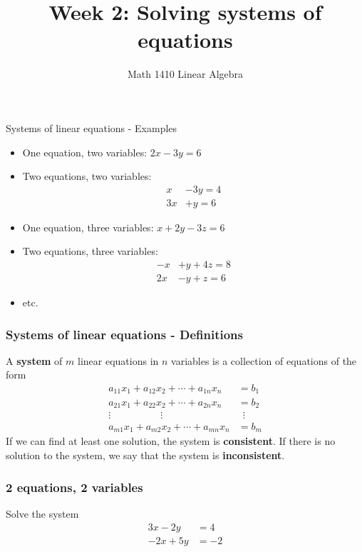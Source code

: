 \documentclass[12pt,t]{beamer}
\date{}
\author{Math 1410 Linear Algebra}
\title{Week 2: Solving systems of equations}
\begin{document}
\begin{frame}
\titlepage
\end{frame}


\begin{frame}{Systems of linear equations - Examples}
\begin{itemize}
 \item One equation, two variables: $2x-3y = 6$
 \item Two equations, two variables:
\begin{align*}
 x&-3y=4\\
3x&+y=6
\end{align*}
 \item One equation, three variables: $x+2y-3z=6$
 \item Two equations, three variables:
\begin{align*}
 -x&+y+4z=8\\
 2x&-y+z=6
\end{align*}
\item etc.
\end{itemize}
\end{frame}
\begin{frame}\frametitle{Systems of linear equations - Definitions}
 \begin{definition}
  A {\bf system} of $m$ linear equations in $n$ variables is a collection of equations of the form
\begin{align*}
 a_{11}x_1+a_{12}x_2+\cdots + a_{1n}x_n & = b_1\\
 a_{21}x_1+a_{22}x_2+\cdots + a_{2n}x_n & = b_2\\
 \vdots \hspace{60pt} \vdots \hspace{48pt} & \hspace{6pt}\vdots\\
 a_{m1}x_1+a_{m2}x_2+\cdots + a_{mn}x_n & = b_m
\end{align*}
If we can find at least one solution, the system is {\bf consistent}. If there is no solution to the system, we say that the system is {\bf inconsistent}.
 \end{definition}

\end{frame}
\begin{frame}\frametitle{2 equations, 2 variables}
 \begin{example}
  Solve the system
\begin{align*}
 3x-2y& = 4\\
 -2x+5y& = -2
\end{align*}

 \end{example}
\end{frame}
\end{document}
